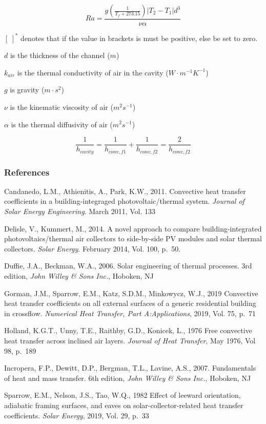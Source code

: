 \begin{equation}
Ra = \frac{g \left(\frac{1}{T_{f}+273.15}\right) \left|T_{2}-T_{1}\right| d^{3}}{\nu\alpha}
\label{eq:BIPVT-Ra}
\end{equation}

\([\:]^{*}\) denotes that if the value in brackets is must be positive, else be set to zero.

\(d\) is the thickness of the channel (\(m\))

\(k_{air}\) is the thermal conductivity of air in the cavity (\(W\cdot m^{-1}K^{-1}\))

\(g\) is gravity (\(m\cdot s^{2}\))

\(\nu\) is the kinematic viscosity of air (\(m^{2}s^{-1}\))

\(\alpha\) is the thermal diffusivity of air (\(m^{2}s^{-1}\))


\begin{equation}
\frac{1}{h_{cavity}}= \frac{1}{h_{conv,f1}}+\frac{1}{h_{conv,f2}} = \frac{2}{h_{conv,f2}}
\label{eq:BIPVT-h-cavity-2}
\end{equation}

\subsubsection{References}\label{BIPVT-references}

Candanedo, L.M., Athienitis, A., Park, K.W., 2011. Convective heat transfer coefficients in a building-integraged photovoltaic/thermal system. \emph{Journal of Solar Energy Engineering}. March 2011, Vol. 133

Delisle, V., Kummert, M., 2014. A novel approach to compare building-integrated \mbox{photovoltaics/thermal} air collectors to side-by-side PV modules and solar thermal collectors. \emph{Solar Energy}. February 2014, Vol. 100, p.~50.

Duffie, J.A., Beckman, W.A., 2006. Solar engineering of thermal processes. 3rd edition, \emph{John Willey \& Sons Inc.}, Hoboken, NJ

Gorman, J.M., Sparrow, E.M., Katz, S.D.M., Minkowycz, W.J., 2019 Convective heat transfer coefficients on all external surfaces of a generic residential building in crossflow. \emph{Numerical Heat Transfer, Part A:Applications}, 2019, Vol. 75, p.~71

Holland, K.G.T., Unny, T.E., Raithby, G.D., Konicek, L., 1976 Free convective heat transfer across inclined air layers. \emph{Journal of Heat Transfer}, May 1976, Vol 98, p.~189

Incropera, F.P., Dewitt, D.P., Bergman, T.L., Lavine, A.S., 2007. Fundamentals of heat and mass transfer. 6th edition, \emph{John Willey \& Sons Inc.}, Hoboken, NJ

Sparrow, E.M., Nelson, J.S., Tao, W.Q., 1982 Effect of leeward orientation, adiabatic framing surfaces, and eaves on solar-collector-related heat transfer coefficients. \emph{Solar Energy}, 2019, Vol. 29, p.~33